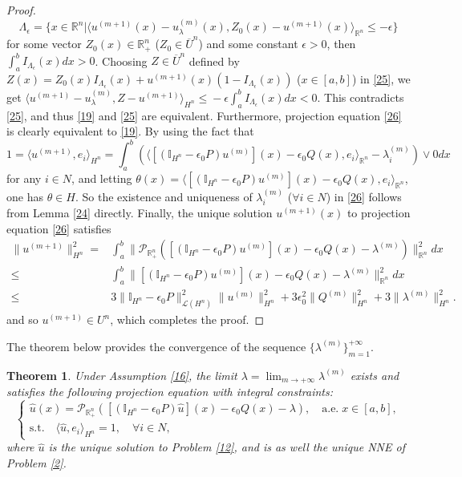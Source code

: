 \documentclass[10pt]{article}
\newtheorem{thm}{Theorem}[section]
\begin{document}
\begin{proof}
$$
\Lambda_{\epsilon}=\{x\in\mathbb{R}^n|\langle u^{(m+1)}(x)-u^{(m)}_{\lambda}(x),Z_0(x)-u^{(m+1)}(x)\rangle_{\mathbb{R}^n}\leq-\epsilon\}
$$
 for some vector $Z_0(x)\in \mathbb{R}^n_+$ ($Z_0\in \overline{U}^n$) and some constant $\epsilon>0$, then  $\int_a^b I_{\Lambda_{\epsilon}}(x)dx>0$. Choosing $Z\in \overline{U}^n$ defined by
 $Z(x)=Z_0(x)I_{\Lambda_{\epsilon}}(x)+u^{(m+1)}(x)(1-I_{\Lambda_{\epsilon}}(x))$ ($x\in[a,b]$)
in \eqref{25}, we get
$
 \langle u^{(m+1)}-u^{(m)}_{\lambda},Z-u^{(m+1)}\rangle_{H^n}
\leq\mbox{}-\epsilon\int_a^b I_{\Lambda_{\epsilon}}(x)dx<0.
$
 This contradicts \eqref{25}, and thus \eqref{19} and \eqref{25} are equivalent. Furthermore,   projection equation  \eqref{26} is clearly equivalent to  \eqref{19}.  By using the fact that
 $$
 1=\langle u^{(m+1)},e_i\rangle_{H^n}=\int_a^b(\langle[(\mathbb{I}_{H^n}-\epsilon_0P){u^{(m)}}](x)-\epsilon_0Q(x),e_i\rangle_{\mathbb{R}^n}-\lambda^{(m)}_i)\vee0dx
 $$
for any $i\in N$, and letting $\theta(x)=\langle[(\mathbb{I}_{H^n}-\epsilon_0P){u^{(m)}}](x)-\epsilon_0Q(x),e_i\rangle_{\mathbb{R}^n}$, one has $\theta\in H$. So the existence and uniqueness of $\lambda_i^{(m)}$ ($\forall i\in N$) in \eqref{26} follows from Lemma \ref{24} directly. Finally, the unique solution $u^{(m+1)}(x)$ to projection equation  \eqref{26} satisfies
\begin{align*}
 \|u^{(m+1)}\|_{H^n}^2=&\int_a^b \|\mathcal{P}_{\mathbb{R}^n_+}([(\mathbb{I}_{H^n}-\epsilon_0P){u^{(m)}}](x)-\epsilon_0Q(x)-\lambda^{(m)})\|_{\mathbb{R}^n}^2dx\\
 \leq&\int_a^b \|[(\mathbb{I}_{H^n}-\epsilon_0P){u^{(m)}}](x)-\epsilon_0Q(x)-\lambda^{(m)}\|_{\mathbb{R}^n}^2dx \\
 \leq&3\|\mathbb{I}_{H^n}-\epsilon_0P\|_{\mathcal{L}(H^n)}^2\|u^{(m)}\|_{H^n}^2+3\epsilon_0^2\|Q^{(m)}\|_{H^n}^2+3\|\lambda^{(m)}\|_{H^n}^2.
\end{align*}
and so $u^{(m+1)}\in U^n$, which completes the proof.
 \end{proof}
The theorem below provides the convergence of the sequence $\{\lambda^{(m)}\}_{m=1}^{+\infty}$.
\begin{thm}\label{49}
Under Assumption \ref{16}, the limit $\lambda=\lim_{m\rightarrow+\infty}\lambda^{(m)}$ exists and satisfies the following   projection equation with integral constraints:
  \begin{equation}\label{30}
   \begin{cases}
\widehat{u}(x)=\mathcal{P}_{\mathbb{R}^n_+}([(\mathbb{I}_{H^n}-\epsilon_0P){\widehat{u}}](x)-\epsilon_0Q(x)-\lambda),\quad \mbox{a.e.} \;x\in[a,b],\\
\mbox{s.t.}\quad \langle \widehat{u},e_i\rangle_{H^n}=1,\quad\forall i\in N,
   \end{cases}
 \end{equation}
 where $\widehat{u}$ is the unique solution to Problem \ref{12}, and is as well the unique NNE of Problem \ref{2}.
\end{thm}
\end{document}
